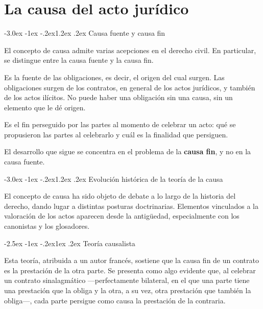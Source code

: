 \documentclass[12pt,oneside]{book}
\makeatletter
\renewcommand\section{\@startsection{section}{1}{\z@}%
  {-3.0ex \@plus -1ex \@minus -.2ex}{1.2ex \@plus .2ex}%
  {\normalfont\large\bfseries\color{acento}}}
\renewcommand\subsection{\@startsection{subsection}{2}{\z@}%
  {-2.5ex \@plus -1ex \@minus -.2ex}{1ex \@plus .2ex}%
  {\normalfont\normalsize\bfseries}}
\makeatother
\begin{document}
\chapter{La causa del acto jurídico}
\label{ch:causa}

\section{Causa fuente y causa fin}

El concepto de causa admite varias acepciones en el derecho civil. En particular, se distingue entre la causa fuente y la causa fin.

\begin{definicion}
Es la fuente de las obligaciones, es decir, el origen del cual surgen. Las obligaciones surgen de los contratos, en general de los actos jurídicos, y también de los actos ilícitos. No puede haber una obligación sin una causa, sin un elemento que le dé origen.
\end{definicion}

\begin{definicion}
Es el fin perseguido por las partes al momento de celebrar un acto: qué se propusieron las partes al celebrarlo y cuál es la finalidad que persiguen.
\end{definicion}

El desarrollo que sigue se concentra en el problema de la \textbf{causa fin}, y no en la causa fuente.

\section{Evolución histórica de la teoría de la causa}

El concepto de causa ha sido objeto de debate a lo largo de la historia del derecho, dando lugar a distintas posturas doctrinarias. Elementos vinculados a la valoración de los actos aparecen desde la antigüedad, especialmente con los canonistas y los glosadores.

\subsection{Teoría causalista}

Esta teoría, atribuida a un autor francés, sostiene que la causa fin de un contrato es la prestación de la otra parte. Se presenta como algo evidente que, al celebrar un contrato sinalagmático ---perfectamente bilateral, en el que una parte tiene una prestación que la obliga y la otra, a su vez, otra prestación que también la obliga---, cada parte persigue como causa la prestación de la contraria.
\end{document}
